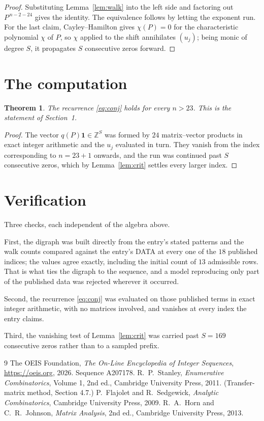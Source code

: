 \documentclass[11pt,a4paper]{article}
\theoremstyle{plain}
\newtheorem{theorem}{Theorem}
\theoremstyle{definition}
\begin{document}
\begin{proof}
Substituting Lemma~\ref{lem:walk} into the left side and factoring out
$P^{\,n-2-24}$ gives the identity. The equivalence follows by letting the exponent
run. For the last claim, Cayley--Hamilton gives $\chi(P)=0$ for the characteristic
polynomial $\chi$ of $P$, so $\chi$ applied to the shift annihilates $(u_j)$; being monic of
degree $S$, it propagates $S$ consecutive zeros forward.
\end{proof}

\section{The computation}

\begin{theorem}
The recurrence \eqref{eq:conj} holds for every $n>23$. This is the statement of
Section~1.
\end{theorem}

\begin{proof}
The vector $q(P)\mathbf{1}\in\mathbb{Z}^{S}$ was formed by $24$ matrix--vector
products in exact integer arithmetic and the $u_j$ evaluated in turn. They vanish from the
index corresponding to $n=23+1$ onwards, and the run was continued past $S$ consecutive
zeros, which by Lemma~\ref{lem:crit} settles every larger index.
\end{proof}

\section{Verification}

Three checks, each independent of the algebra above.

First, the digraph was built directly from the entry's stated patterns and the walk counts
compared against the entry's DATA at every one of the $18$ published indices; the
values agree exactly, including the initial count of $13$ admissible rows. That is
what ties the digraph to the sequence, and a model reproducing only part of the published
data was rejected wherever it occurred.

Second, the recurrence \eqref{eq:conj} was evaluated on those published terms in exact
integer arithmetic, with no matrices involved, and vanishes at every index the entry claims.

Third, the vanishing test of Lemma~\ref{lem:crit} was carried past $S=169$ consecutive
zeros rather than to a sampled prefix.

\begin{thebibliography}{9}
 The OEIS Foundation, \emph{The On-Line Encyclopedia of Integer
Sequences}, \url{https://oeis.org}, 2026. Sequence A207178.
 R.~P.~Stanley, \emph{Enumerative Combinatorics}, Volume 1, 2nd ed.,
Cambridge University Press, 2011. (Transfer-matrix method, Section 4.7.)
 P.~Flajolet and R.~Sedgewick, \emph{Analytic Combinatorics}, Cambridge
University Press, 2009.
 R.~A.~Horn and C.~R.~Johnson, \emph{Matrix Analysis}, 2nd ed., Cambridge
University Press, 2013.
\end{thebibliography}
\end{document}
